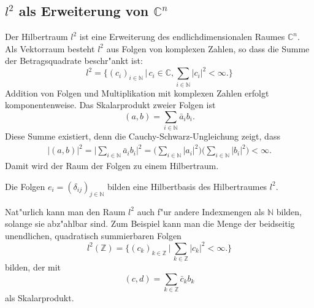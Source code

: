 \subsection{$l^2$ als Erweiterung von $\mathbb C^n$}
Der Hilbertraum $l^2$ ist eine Erweiterung des endlichdimensionalen
Raumes $\mathbb C^n$.
Als Vektorraum besteht $l^2$ aus Folgen von komplexen Zahlen,
so dass die Summe der Betragsquadrate beschr"ankt ist:
\[
l^2=\biggl\{
(c_i)_{i\in\mathbb N}\,\biggl|\,c_i\in\mathbb C,
\sum_{i\in\mathbb N} |c_i|^2 <\infty
\biggr.\biggr\}
\]
Addition von Folgen und Multiplikation mit komplexen Zahlen erfolgt 
komponentenweise.
Das Skalarprodukt zweier Folgen ist
\[
(a, b)=\sum_{i\in\mathbb N} \bar a_i b_i.
\]
Diese Summe existiert, denn die Cauchy-Schwarz-Ungleichung zeigt,
dass
\begin{align*}
|(a,b)|^2
=
\biggl|
\sum_{i\in\mathbb N} \bar a_ib_i
\biggr|^2
=
\biggl(
\sum_{i\in\mathbb N} |a_i|^2
\biggr)
\biggl(
\sum_{i\in\mathbb N} |b_i|^2
\biggr)
<\infty.
\end{align*}
Damit wird der Raum der Folgen zu einem Hilbertraum.

Die Folgen $e_i=(\delta_{ij})_{j\in\mathbb N}$ bilden eine Hilbertbasis
des Hilbertraumes $l^2$. 

Nat"urlich kann man den Raum $l^2$ auch f"ur andere Indexmengen als
$\mathbb N$ bilden, solange sie abz"ahlbar sind. Zum Beispiel kann man
die Menge der beidseitig unendlichen, quadratisch summierbaren Folgen
\[
l^2(\mathbb Z)=
\biggl\{
(c_k)_{k\in\mathbb Z}\,\biggl|\,
\sum_{k\in\mathbb Z}|c_k|^2<\infty
\biggr.
\biggr\}
\]
bilden, der mit
\[
(c,d)=\sum_{k\in\mathbb Z} \bar c_kb_k
\]
als Skalarprodukt.

